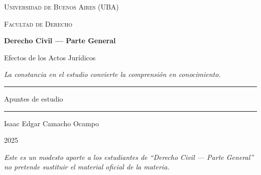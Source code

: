\documentclass[12pt,oneside]{book}
\newcommand{\universidad}{Universidad de Buenos Aires (UBA)}
\newcommand{\facultad}{Facultad de Derecho}
\newcommand{\materia}{Derecho Civil --- Parte General}
\newcommand{\titulo}{Efectos de los Actos Jurídicos}
\newcommand{\autor}{Isaac Edgar Camacho Ocampo}
\newcommand{\anio}{2025}
\begin{document}
\begin{titlepage}

\thispagestyle{empty}

\begin{center}

\vspace*{1cm}

{\large \textsc{\universidad}}

\vspace{0.2cm}

{\large \textsc{\facultad}}

\vspace{3cm}

{\huge \textbf{\materia}}

\vspace{1cm}

{\LARGE \titulo}

\vspace{0.8cm}

\textit{La constancia en el estudio convierte la comprensión en conocimiento.}

\vspace{1.2cm}

\rule{0.70\textwidth}{0.5pt}

\vspace{0.5cm}

{\large Apuntes de estudio}

\vspace{0.5cm}

\rule{0.70\textwidth}{0.5pt}

\vfill

{\large \autor}

\vspace{0.3cm}

{\large \anio}

\end{center}

\vfill

\begin{flushleft}
\textit{Este es un modesto aporte a los estudiantes de ``\materia'' no pretende sustituir el material oficial de la materia.}
\end{flushleft}

\end{titlepage}

\tableofcontents
\end{document}
